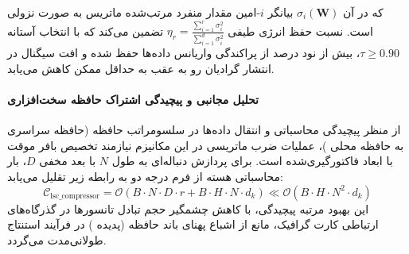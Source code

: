 که در آن $\sigma_i(\mathbf{W})$ بیانگر $i$-امین مقدار منفرد مرتب‌شده ماتریس به صورت نزولی است. نسبت حفظ انرژی طیفی $\eta_r = \frac{\sum_{i=1}^r \sigma_i^2}{\sum_{i=1}^{d} \sigma_i^2}$ تضمین می‌کند که با انتخاب آستانه $\tau \ge 0.90$، بیش از نود درصد از پراکندگی واریانس داده‌ها حفظ شده و افت سیگنال در انتشار گرادیان رو به عقب به حداقل ممکن کاهش می‌یابد.

\paragraph{تحلیل مجانبی و پیچیدگی اشتراک حافظه سخت‌افزاری}
از منظر پیچیدگی محاسباتی و انتقال داده‌ها در سلسومراتب حافظه (حافظه سراسری  به حافظه محلی )، عملیات ضرب ماتریسی در این مکانیزم نیازمند تخصیص بافر موقت با ابعاد فاکتورگیری‌شده است. برای پردازش دنباله‌ای به طول $N$ با بعد مخفی $D$، بار محاسباتی هسته از فرم درجه دو به رابطه زیر تقلیل می‌یابد:
\begin{equation}
\label{eq:complexity_lsc_compressor}
\mathcal{C}_{\text{lsc\_compressor}} = \mathcal{O}\left( B \cdot N \cdot D \cdot r + B \cdot H \cdot N \cdot d_k \right) \ll \mathcal{O}\left( B \cdot H \cdot N^2 \cdot d_k \right)
\end{equation}
این بهبود مرتبه پیچیدگی، با کاهش چشمگیر حجم تبادل تانسورها در گذرگاه‌های ارتباطی کارت گرافیک، مانع از اشباع پهنای باند حافظه (پدیده ) در فرآیند استنتاج طولانی‌مدت می‌گردد.
